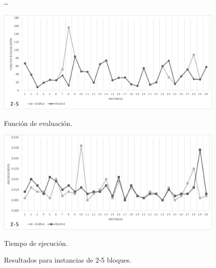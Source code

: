 \documentclass[letter, 10pt]{article}
\begin{document}
\begin{figure}[H]
    \begin{adjustwidth}{-\marginparwidth}{-\marginparwidth}
        \centering
        \begin{minipage}{.5\linewidth}
            \centering
            \includegraphics[width=\linewidth]{./img/2-5.png}
            \caption*{Función de evaluación.}
            \label{fig:2-5_g}
        \end{minipage}%
        \begin{minipage}{.5\linewidth}
            \centering
            \includegraphics[width=\linewidth]{./img/2-5_t.png}
            \caption*{Tiempo de ejecución.}
            \label{fig:2-5_t}
        \end{minipage}
    \end{adjustwidth}
    \caption{Resultados para instancias de 2-5 bloques.}
    \label{fig:2-5}
\end{figure}
\end{document}

